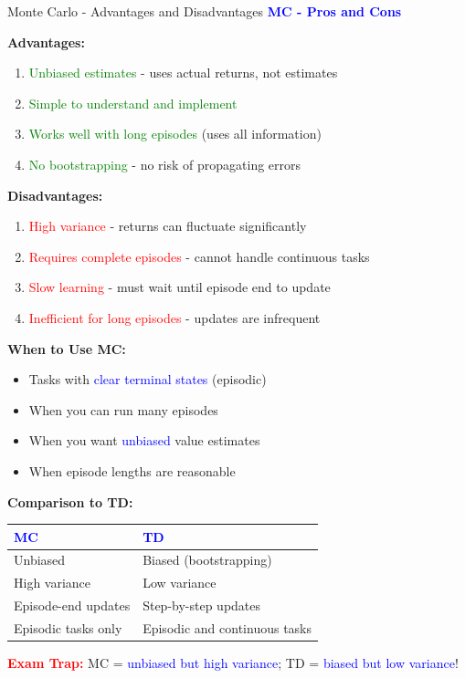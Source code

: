 \documentclass[8pt]{beamer}
\begin{document}
	\begin{frame}{Monte Carlo - Advantages and Disadvantages}
		\fontsize{6.5}{7.5}\selectfont
		\textcolor{blue}{\textbf{MC - Pros and Cons}}
		
		\textbf{Advantages:}
		\begin{enumerate}
			\item \textcolor{green}{Unbiased estimates} - uses actual returns, not estimates
			\item \textcolor{green}{Simple to understand and implement}
			\item \textcolor{green}{Works well with long episodes} (uses all information)
			\item \textcolor{green}{No bootstrapping} - no risk of propagating errors
		\end{enumerate}
		
		\textbf{Disadvantages:}
		\begin{enumerate}
			\item \textcolor{red}{High variance} - returns can fluctuate significantly
			\item \textcolor{red}{Requires complete episodes} - cannot handle continuous tasks
			\item \textcolor{red}{Slow learning} - must wait until episode end to update
			\item \textcolor{red}{Inefficient for long episodes} - updates are infrequent
		\end{enumerate}
		
		\textbf{When to Use MC:}
		\begin{itemize}
			\item Tasks with \textcolor{blue}{clear terminal states} (episodic)
			\item When you can run many episodes
			\item When you want \textcolor{blue}{unbiased} value estimates
			\item When episode lengths are reasonable
		\end{itemize}
		
		\textbf{Comparison to TD:}
		\begin{tabular}{|p{4cm}|p{4cm}|}
			\hline
			\textcolor{blue}{MC} & \textcolor{blue}{TD} \\
			\hline
			Unbiased & Biased (bootstrapping) \\
			\hline
			High variance & Low variance \\
			\hline
			Episode-end updates & Step-by-step updates \\
			\hline
			Episodic tasks only & Episodic and continuous tasks \\
			\hline
		\end{tabular}
		
		\textcolor{red}{\textbf{Exam Trap:}} MC = \textcolor{blue}{unbiased but high variance}; TD = \textcolor{blue}{biased but low variance}!
	\end{frame}
	
\end{document}
